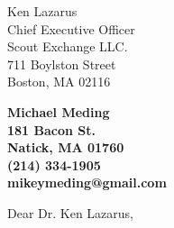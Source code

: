 \documentclass[11pt]{letter} %
\begin{document}

\begin{letter}{Ken Lazarus \\
Chief Executive Officer \\
Scout Exchange LLC. \\
711 Boylston Street \\
Boston, MA 02116 
}


\begin{center}
\large\bf Michael Meding \\ %
181 Bacon St. \\ Natick, MA 01760 \\ (214) 334-1905 \\ mikeymeding@gmail.com %
\end{center} 
\vfill

\signature{Michael Meding} %


\opening{Dear Dr. Ken Lazarus,} 

 

\end{letter}
\end{document}
